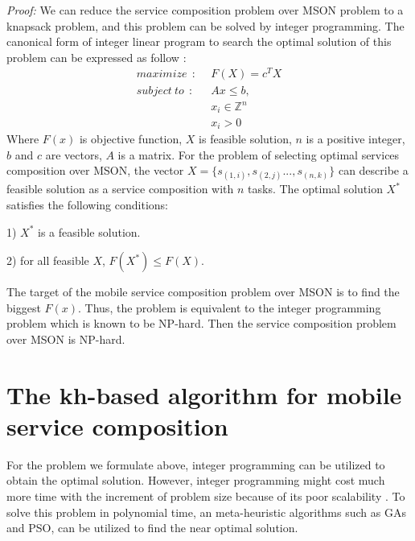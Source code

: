 \documentclass[10pt,journal,compsoc]{IEEEtran}
\begin{document}
\textit{Proof:} We can reduce the service composition problem over MSON problem to a knapsack problem, and this problem can be solved by integer programming. 
The canonical form of integer linear program to search the optimal solution of this problem can be expressed as follow \cite{papadimitriou1998combinatorial}:\
\begin{align}
maximize     \ \ : \ \ & F(X) = c^{T}X     \\\nonumber
subject\ to  \ \ : \ \ & Ax \le b, \\\nonumber
               	       & x_i \in \mathbb{Z}^{n} \\\nonumber
                       & x_i > 0 
\end{align}
Where $F(x)$ is objective function, $X$ is feasible solution, $n$ is a positive integer, $b$ and $c$ are vectors, $A$ is a matrix.
For the problem of selecting optimal services composition over MSON, the vector $X = \{s_{(1,i)}, s_{(2,j)}. . . , s_{(n,k)}\}$ can describe a feasible solution as a service composition with $n$ tasks. 
The optimal solution  $X^*$ satisfies the following conditions:

1) $X^*$ is a feasible solution.

​2) for all feasible $X$, $F(X^*) \le F(X)$. 

The target of the mobile service composition problem over MSON is to find the biggest $F(x)$. Thus, the problem is equivalent to the integer programming problem which is known to be NP-hard. Then the service composition problem over MSON is NP-hard.

\section{The kh-based algorithm for mobile service composition}
For the problem we formulate above, integer programming can be utilized to obtain the optimal solution. However, integer programming might cost much more time with the increment of problem size because of its poor scalability \cite{nemhauser1988integer}. To solve this problem in polynomial time, an meta-heuristic algorithms such as GAs and PSO, can be utilized to find the near optimal solution.
\end{document}
